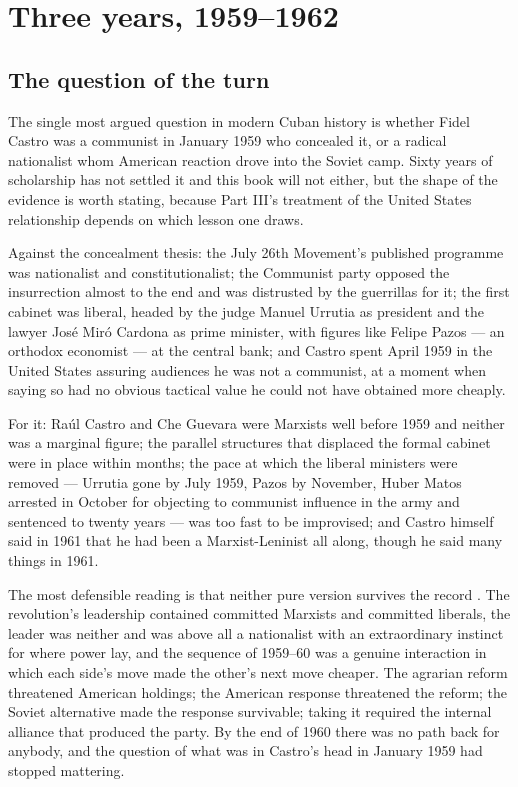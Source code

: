 \chapter{Three years, 1959--1962}
\label{ch:revolution}

\section{The question of the turn}

The single most argued question in modern Cuban history is whether Fidel Castro
was a communist in January 1959 who concealed it, or a radical nationalist whom
American reaction drove into the Soviet camp. Sixty years of scholarship has
not settled it and this book will not either, but the shape of the evidence is
worth stating, because Part III's treatment of the United States relationship
depends on which lesson one draws.

Against the concealment thesis: the July 26th Movement's published programme
was nationalist and constitutionalist; the Communist party opposed the
insurrection almost to the end and was distrusted by the guerrillas for it; the
first cabinet was liberal, headed by the judge Manuel Urrutia as president and
the lawyer Jos\'e Mir\'o Cardona as prime minister, with figures like Felipe
Pazos --- an orthodox economist --- at the central bank; and Castro spent April
1959 in the United States assuring audiences he was not a communist, at a
moment when saying so had no obvious tactical value he could not have obtained
more cheaply.

For it: Ra\'ul Castro and Che Guevara were Marxists well before 1959 and neither
was a marginal figure; the parallel structures that displaced the formal
cabinet were in place within months; the pace at which the liberal ministers
were removed --- Urrutia gone by July 1959, Pazos by November, Huber Matos
arrested in October for objecting to communist influence in the army and
sentenced to twenty years --- was too fast to be improvised; and Castro himself
said in 1961 that he had been a Marxist-Leninist all along, though he said many
things in 1961.

The most defensible reading is that neither pure version survives the record
\citep{farber2006}.
The revolution's leadership contained committed Marxists and committed
liberals, the leader was neither and was above all a nationalist with an
extraordinary instinct for where power lay, and the sequence of 1959--60 was a
genuine interaction in which each side's move made the other's next move
cheaper. The agrarian reform threatened American holdings; the American
response threatened the reform; the Soviet alternative made the response
survivable; taking it required the internal alliance that produced the party.
By the end of 1960 there was no path back for anybody, and the question of what
was in Castro's head in January 1959 had stopped mattering.

